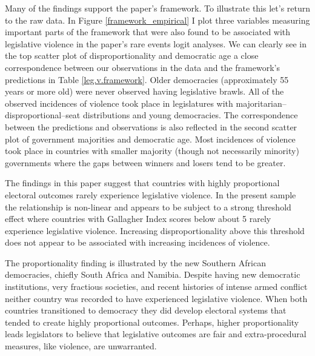 \documentclass[a4paper]{article}\usepackage{graphicx, color}
\begin{document}
{{Many of the findings support the paper's framework. To illustrate this let's return to the raw data. In Figure \ref{framework_empirical} I plot three variables measuring important parts of the framework that were also found to be associated with legislative violence in the paper's rare events logit analyses. We can clearly see in the top scatter plot of disproportionality and democratic age a close correspondence between our observations in the data and the framework's predictions in Table \ref{leg.v.framework}. Older democracies (approximately 55 years or more old) were never observed having legislative brawls. All of the observed incidences of violence took place in legislatures with majoritarian--disproportional--seat distributions and young democracies. The correspondence between the predictions and observations is also reflected in the second scatter plot of government majorities and democratic age. Most incidences of violence took place in countries with smaller majority (though not necessarily minority) governments where the gaps between winners and losers tend to be greater.

The findings in this paper suggest that countries with highly proportional electoral outcomes rarely experience legislative violence. In the present sample the relationship is non-linear and appears to be subject to a strong threshold effect where countries with Gallagher Index scores below about 5 rarely experience legislative violence. Increasing disproportionality above this threshold does not appear to be associated with increasing incidences of violence.

The proportionality finding is illustrated by the new Southern African democracies, chiefly South Africa and Namibia. Despite having new democratic institutions, very fractious societies, and recent histories of intense armed conflict neither country was recorded to have experienced legislative violence. When both countries transitioned to democracy they did develop electoral systems that tended to create highly proportional outcomes. Perhaps, higher proportionality leads legislators to believe that legislative outcomes are fair and extra-procedural measures, like violence, are unwarranted.    

}}
\end{document}
